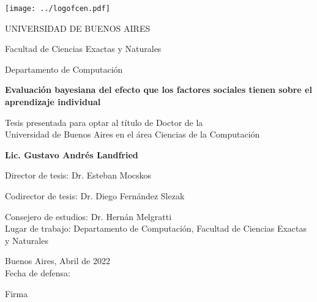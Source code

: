 \documentclass[a4paper,10pt]{book}
\author{Gustavo Landfried}
\makeatletter
\renewcommand{\frontmatter}{\cleardoublepage\@mainmatterfalse}
\theoremstyle{definition}
\newcommand{\TITULO}[0]{Evaluaci\'on bayesiana del efecto que los factores sociales tienen sobre el aprendizaje individual}
\makeatother
\begin{document}
\deactivatequoting %

\frontmatter
{}

\begin{center}

\texttt{[image: ../logofcen.pdf]}

\medskip
UNIVERSIDAD DE BUENOS AIRES

Facultad de Ciencias Exactas y Naturales

Departamento de Computaci\'on


\vspace{3cm}

\textbf{\LARGE \TITULO}

\vspace{1cm}



Tesis presentada para optar al t\'itulo de Doctor de la \\
Universidad de Buenos Aires en el \'area Ciencias de la Computaci\'on

\vspace{3cm}

\textbf{Lic. Gustavo Andr\'es Landfried}

\end{center}

\vspace{2.5cm}

\noindent Director de tesis: Dr. Esteban Mocskos 

\noindent Codirector de tesis: Dr. Diego Fern\'andez Slezak

\noindent Consejero de estudios: Dr. Hern\'an Melgratti \\

\noindent Lugar de trabajo: Departamento de Computaci\'on, Facultad de Ciencias Exactas y Naturales

\vspace{0.5cm}

\noindent Buenos Aires, Abril de 2022\\

\noindent Fecha de defensa: \\%

\vspace{0.5cm}

\hspace*{0pt}\hfill Firma \hspace{2cm}
\end{document}
